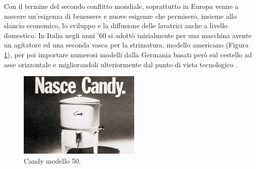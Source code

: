 Con il termine del secondo conflitto mondiale, soprattutto in Europa venne a nascere un’esigenza di benessere e nuove esigenze che permisero, insieme allo slancio economico, lo sviluppo e la diffusione delle lavatrici anche a livello domestico. 
In Italia negli anni ’60 si adottò inizialmente per una macchina avente un agitatore ed una seconda vasca per la strizzatura, modello americano (Figura \ref{fig:my_label}), per poi importare numerosi modelli dalla Germania basati però sul cestello ad asse orizzontale e migliorandoli ulteriormente dal punto di vista tecnologico \cite{asquer2007rivoluzione}.

\begin{figure}[H]
    \centering
    \includegraphics{candy.jpg}
    \caption{Candy modello 50.}
    \label{fig:my_label}
\end{figure}
